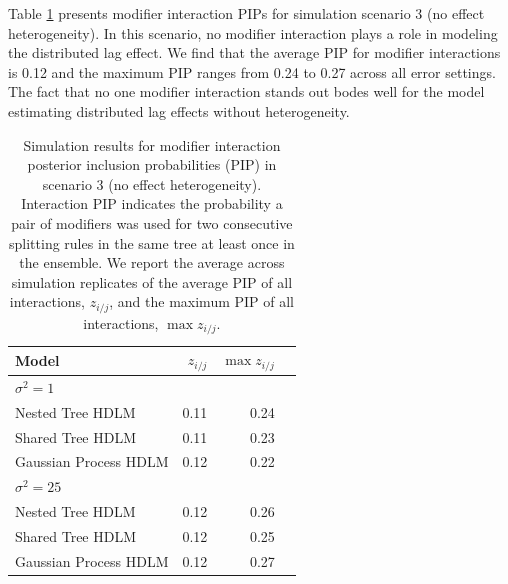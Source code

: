 \documentclass[12pt]{article}
\begin{document}
Table \ref{tab:scen3_inc} presents modifier interaction PIPs for simulation scenario 3 (no effect heterogeneity). In this scenario, no modifier interaction plays a role in modeling the distributed lag effect. We find that the average PIP for modifier interactions is 0.12 and the maximum PIP ranges from 0.24 to 0.27 across all error settings. The fact that no one modifier interaction stands out bodes well for the model estimating distributed lag effects without heterogeneity.

\begin{table}[!ht]
\footnotesize
    \centering
    \caption{Simulation results for modifier interaction posterior inclusion probabilities (PIP) in scenario 3 (no effect heterogeneity). Interaction PIP indicates the probability a pair of modifiers was used for two consecutive splitting rules in the same tree at least once in the ensemble. We report the average across simulation replicates of the average PIP of all interactions, $z_{i/j}$, and the maximum PIP of all interactions, $\max z_{i/j}$.}\vspace{6pt}
    \label{tab:scen3_inc}
    \begin{tabular}{lrrr}
        \toprule[2pt]
        Model & $z_{i/j}$ & $\max z_{i/j}$\\
        \midrule
        \multicolumn{3}{l}{$\sigma^2=1$}\\
Nested Tree HDLM & 0.11 & 0.24\\
Shared Tree HDLM & 0.11 & 0.23\\
Gaussian Process HDLM & 0.12 & 0.22\\


        \midrule
        \multicolumn{3}{l}{$\sigma^2=25$}\\
Nested Tree HDLM & 0.12 & 0.26\\
Shared Tree HDLM & 0.12 & 0.25\\
Gaussian Process HDLM & 0.12 & 0.27\\
        \bottomrule[2pt]
    \end{tabular}
\end{table}



\end{document}
